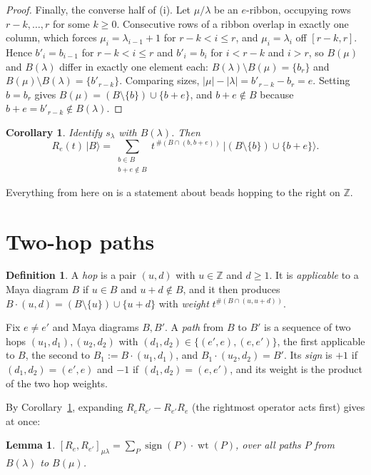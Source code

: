 \documentclass[11pt]{article}
\newtheorem{lemma}[theorem]{Lemma}
\newtheorem{corollary}[theorem]{Corollary}
\theoremstyle{definition}
\newtheorem{definition}[theorem]{Definition}
\newcommand{\Z}{\mathbb{Z}}
\begin{document}
\begin{proof}
Finally, the converse half of (i). Let $\mu/\lambda$ be an $e$-ribbon, occupying rows
$r-k,\dots,r$ for some $k\ge0$. Consecutive rows of a ribbon overlap in exactly one column,
which forces $\mu_i=\lambda_{i-1}+1$ for $r-k<i\le r$, and $\mu_i=\lambda_i$ off
$[r-k,r]$. Hence $b'_i=b_{i-1}$ for $r-k<i\le r$ and $b'_i=b_i$ for $i<r-k$ and $i>r$, so
$B(\mu)$ and $B(\lambda)$ differ in exactly one element each: $B(\lambda)\setminus B(\mu)=\{b_r\}$
and $B(\mu)\setminus B(\lambda)=\{b'_{r-k}\}$. Comparing sizes, $|\mu|-|\lambda|=b'_{r-k}-b_r=e$.
Setting $b=b_r$ gives $B(\mu)=(B\setminus\{b\})\cup\{b+e\}$, and $b+e\notin B$ because
$b+e=b'_{r-k}\notin B(\lambda)$.
\end{proof}

\begin{corollary}\label{cor:Rmaya}
Identify $s_\lambda$ with $B(\lambda)$. Then
\[
R_e(t)\,\lvert B\rangle=\sum_{\substack{b\in B\\ b+e\notin B}}
t^{\,\#(B\cap(b,b+e))}\ \bigl\lvert (B\setminus\{b\})\cup\{b+e\}\bigr\rangle .
\]
\end{corollary}

Everything from here on is a statement about beads hopping to the right on $\Z$.

\section{Two-hop paths}

\begin{definition}
A \emph{hop} is a pair $(u,d)$ with $u\in\Z$ and $d\ge1$. It is \emph{applicable} to a Maya
diagram $B$ if $u\in B$ and $u+d\notin B$, and it then produces $B\cdot(u,d)=(B\setminus\{u\})\cup\{u+d\}$
with \emph{weight} $t^{\#(B\cap(u,u+d))}$.

Fix $e\ne e'$ and Maya diagrams $B,B'$. A \emph{path} from $B$ to $B'$ is a sequence of two hops
$(u_1,d_1),(u_2,d_2)$ with $(d_1,d_2)\in\{(e',e),(e,e')\}$, the first applicable to $B$, the
second to $B_1:=B\cdot(u_1,d_1)$, and $B_1\cdot(u_2,d_2)=B'$. Its \emph{sign} is $+1$ if
$(d_1,d_2)=(e',e)$ and $-1$ if $(d_1,d_2)=(e,e')$, and its weight is the product of the two hop
weights.
\end{definition}

By Corollary~\ref{cor:Rmaya}, expanding $R_eR_{e'}-R_{e'}R_e$ (the rightmost operator acts first)
gives at once:

\begin{lemma}\label{lem:sum}
$[R_e,R_{e'}]_{\mu\lambda}=\sum_{P}\operatorname{sign}(P)\cdot\operatorname{wt}(P)$, over all
paths $P$ from $B(\lambda)$ to $B(\mu)$.
\end{lemma}
\end{document}
